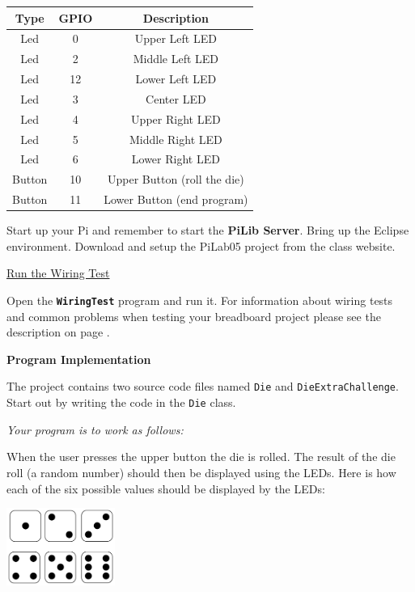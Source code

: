 \begin{center}
	\begin{tabular}{c | c | c}
		\hline
		\textbf{Type} & \textbf{GPIO} & \textbf{Description} \\ \hline
		Led & 0 & Upper Left LED\\ 
		\hline
		Led & 2 & Middle Left LED\\ 
		\hline
		Led & 12 & Lower Left LED\\ 
		\hline
		Led & 3 & Center LED\\ 
		\hline
		Led & 4 & Upper Right LED\\ 
		\hline
		Led & 5 & Middle Right LED\\ 
		\hline
		Led & 6 & Lower Right LED\\ 
		\hline
		Button & 10 & Upper Button (roll the die) \\ 
		\hline
		Button & 11 & Lower Button (end program) \\ 
		\hline	
	\end{tabular}
\end{center}

\vspace{10pt}

Start up your Pi and remember to start the \textbf{PiLib Server}. Bring up the Eclipse environment. Download and setup the PiLab05 project from the class website.

\underline{Run the Wiring Test}

Open the \textbf{\texttt{WiringTest}} program and run it. For information about wiring tests and common problems when testing your breadboard project please see the description on page \pageref{wiringTestDescription}.

\textbf{Program Implementation}

The project contains two source code files named \texttt{Die} and \texttt{DieExtraChallenge}. Start out by writing the code in the \texttt{Die} class.

\textit{Your program is to work as follows:}

When the user presses the upper button the die is rolled. The result of the die roll (a random number) should then be displayed using the LEDs. Here is how each of the six possible values should be displayed by the LEDs:

{\centering
	\beforefig
	\centerline{\includegraphics[height=1in]{pi_images/lab05images/DieFaces.png}}
	\afterfig
}


